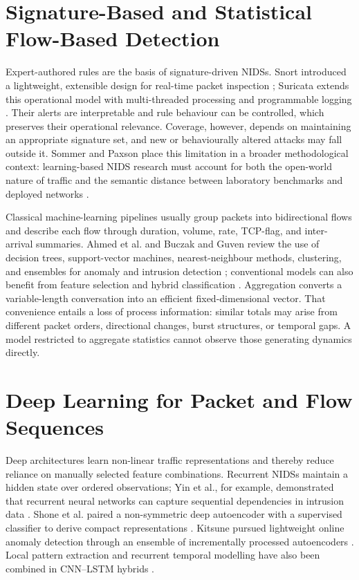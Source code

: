 \documentclass[11pt,fleqn]{report}
\begin{document}
\section{Signature-Based and Statistical Flow-Based Detection}
\label{subsec:rw_signature_flow}

Expert-authored rules are the basis of signature-driven NIDSs. Snort introduced a lightweight, extensible design for real-time packet inspection \cite{Roesch1999}; Suricata extends this operational model with multi-threaded processing and programmable logging \cite{SuricataGuide2026}. Their alerts are interpretable and rule behaviour can be controlled, which preserves their operational relevance. Coverage, however, depends on maintaining an appropriate signature set, and new or behaviourally altered attacks may fall outside it. Sommer and Paxson place this limitation in a broader methodological context: learning-based NIDS research must account for both the open-world nature of traffic and the semantic distance between laboratory benchmarks and deployed networks \cite{SommerPaxson2010}.

Classical machine-learning pipelines usually group packets into bidirectional flows and describe each flow through duration, volume, rate, TCP-flag, and inter-arrival summaries. Ahmed et al. and Buczak and Guven review the use of decision trees, support-vector machines, nearest-neighbour methods, clustering, and ensembles for anomaly and intrusion detection \cite{Ahmed2016Survey,BuczakGuven2016}; conventional models can also benefit from feature selection and hybrid classification \cite{Aljawarneh2018}. Aggregation converts a variable-length conversation into an efficient fixed-dimensional vector. That convenience entails a loss of process information: similar totals may arise from different packet orders, directional changes, burst structures, or temporal gaps. A model restricted to aggregate statistics cannot observe those generating dynamics directly.

\section{Deep Learning for Packet and Flow Sequences}
\label{subsec:rw_deep_sequences}

Deep architectures learn non-linear traffic representations and thereby reduce reliance on manually selected feature combinations. Recurrent NIDSs maintain a hidden state over ordered observations; Yin et al., for example, demonstrated that recurrent neural networks can capture sequential dependencies in intrusion data \cite{Yin2017RNNIDS}. Shone et al. paired a non-symmetric deep autoencoder with a supervised classifier to derive compact representations \cite{Shone2018NNAE}. Kitsune pursued lightweight online anomaly detection through an ensemble of incrementally processed autoencoders \cite{Mirsky2018Kitsune}. Local pattern extraction and recurrent temporal modelling have also been combined in CNN--LSTM hybrids \cite{Ullah2024IDSINT}.
\end{document}
